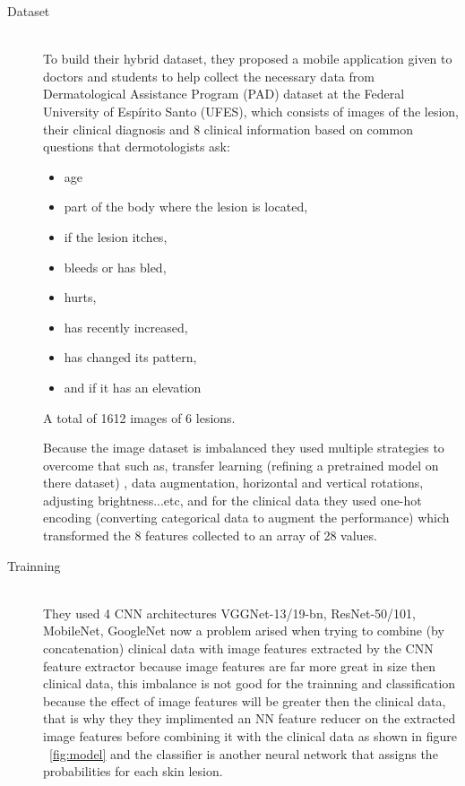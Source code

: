 \begin{description}
\item[Dataset] \hfill \\
To build their hybrid dataset, they proposed a mobile application given to doctors and students to help collect the necessary data from Dermatological Assistance Program (PAD) dataset at the Federal University of Espírito Santo (UFES), which consists of images of the lesion, their clinical diagnosis and 8 clinical information based on common questions that dermotologists ask:
\begin{itemize}
    \item age
    \item part of the body where the lesion is located,
    \item if the lesion itches,
    \item bleeds or has bled,
    \item hurts, 
    \item has recently increased, 
    \item has changed its pattern, 
    \item and if it has an elevation
\end{itemize}

A total of 1612 images of 6 lesions.

Because the image dataset is imbalanced they used multiple strategies to overcome that such as, transfer learning (refining a pretrained model on there dataset) , data augmentation, horizontal and vertical rotations, adjusting brightness...etc, and for the clinical data they used one-hot encoding (converting categorical data to augment the performance) which transformed the 8 features collected to an array of 28 values.

\item[Trainning] \hfill \\
    They used 4 CNN architectures VGGNet-13/19-bn, ResNet-50/101, MobileNet, GoogleNet
    now a problem arised when trying to combine (by concatenation) clinical data with image features extracted by the CNN feature extractor because image features are far more great in size then clinical data, this imbalance is not good for the trainning and classification because the effect of image features will be greater then the clinical data, that is why they  they implimented an NN feature reducer on the extracted image features before combining it with the clinical data as shown in figure ~\ref{fig:model}  and the classifier is another neural network that assigns the probabilities for each skin lesion.


\end{description}
